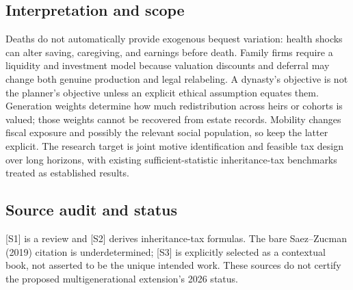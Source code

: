 \documentclass[11pt,a4paper]{article}
\begin{document}
\subsection*{Interpretation and scope}
Deaths do not automatically provide exogenous bequest variation: health shocks can alter saving, caregiving, and earnings before death. Family firms require a liquidity and investment model because valuation discounts and deferral may change both genuine production and legal relabeling. A dynasty's objective is not the planner's objective unless an explicit ethical assumption equates them. Generation weights determine how much redistribution across heirs or cohorts is valued; those weights cannot be recovered from estate records. Mobility changes fiscal exposure and possibly the relevant social population, so keep the latter explicit. The research target is joint motive identification and feasible tax design over long horizons, with existing sufficient-statistic inheritance-tax benchmarks treated as established results.

\subsection*{Source audit and status}
[S1] is a review and [S2] derives inheritance-tax formulas. The bare Saez--Zucman (2019) citation is underdetermined; [S3] is explicitly selected as a contextual book, not asserted to be the unique intended work. These sources do not certify the proposed multigenerational extension's 2026 status.
\end{document}
